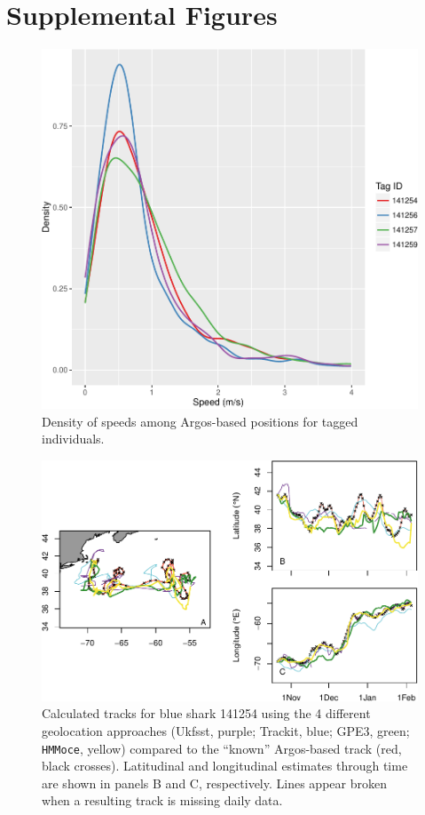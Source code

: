 \clearpage

\section{Supplemental Figures}

\begin{figure}[htbp]
\centering
\includegraphics[width=.7\textwidth]{images/A1_Fig1.pdf}
\caption{Density of speeds among Argos-based positions for
tagged individuals.}
\label{fig:a1f1}
\end{figure}

\clearpage

\begin{figure}[htbp]
\centering
\includegraphics[width=1\textwidth]{images/A1_Fig2.pdf}
\caption[Comparison of track methods for blue shark 141254]{Calculated tracks for blue shark 141254
using the 4 different geolocation approaches (Ukfsst, purple; Trackit,
blue; GPE3, green; \texttt{HMMoce}, yellow) compared to the ``known''
Argos-based track (red, black crosses). Latitudinal and longitudinal
estimates through time are shown in panels B and C, respectively. Lines
appear broken when a resulting track is missing daily data.}
\label{fig:a1f2}
\end{figure}

